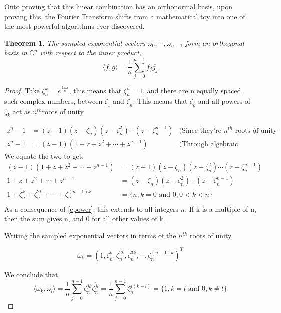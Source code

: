 \documentclass[11pt]{amsart}
\newtheorem{thm}{Theorem}[section]
\theoremstyle{definition}
\theoremstyle{remark}
\numberwithin{equation}{section}
\begin{document}
Onto proving that this linear combination has an orthonormal basis, upon proving this, the Fourier Transform shifts from a mathematical toy into one of the most powerful algorithms ever discovered.
\pagebreak
\begin{thm} \label{orthonormalbasis}
	The sampled exponential vectors $\omega_0, \cdots , \omega_{n-1}$ form an orthogonal basis in $\mathbb{C}^n$ with respect to the inner product,
	\[
		\langle f,g \rangle = \frac{1}{n} \sum_{j=0}^{n-1} f_j \overline{g_j}
	\]
\end{thm}
\begin{proof}
Take $\zeta_n^k = e^{\frac{2\pi k i}{n}}$, this means that $\zeta^n_n = 1$, and there are n equally spaced such complex numbers, between $\zeta_1$ and $\zeta_n$. This means that $\zeta_k$ and all powers of $\zeta_k$ act as $n^{th} $roots of unity

	\begin{align}
		z^{n}-1 &= (z-1)(z -  \zeta_n)(z-\zeta_n^2)\cdots(z - \zeta_n^{n-1}) &\text{(Since they're $n^{th}$ roots of unity})  \label{pf1} \\
		z^n-1 &= (z-1)(1 + z + z^2 + \cdots + z^{n-1}) &\text{(Through algebraic factorization)} \label{pf2}
	\end{align}
	We equate the two to get,
	\begin{align*}
	(z-1)(1 + z + z^2 + \cdots + z^{n-1})  &= (z-1)(z -  \zeta_n)(z-\zeta_n^2)\cdots(z - \zeta_n^{n-1}) \\
	1 + z + z^2 + \cdots + z^{n-1}  &= (z -  \zeta_n)(z-\zeta_n^2)\cdots(z - \zeta_n^{n-1}) \\
		1 + \zeta_n^k + \zeta_n^{2k} + \cdots + \zeta_n^{(n-1) k} &= \{n,k = 0 \text{ and } 0, 0 < k < n \} \\
	\end{align*}
As a consequence of \ref{epower}, this extends to all integers $n$. If k is a multiple of n, then the sum gives n, and 0 for all other values of k.

Writing the sampled exponential vectors in terms of the $n^{th}$ roots of unity,

\[
	\omega_k = (1, \zeta_n^k, \zeta_n^{2k},\zeta_n^{3k}, \cdots, \zeta_n^{(n-1)k})^T
\]

We conclude that, 
\[
	\langle	\omega_k, \omega_l \rangle = \frac{1}{n} \sum_{j=0}^{n-1} \zeta_{n}^{jk} \overline{\zeta_{n}^{jl}} = \frac{1}{n} \sum_{j=0}^{n-1} \zeta_n^{j(k-l)} = \{1, k = l \text{ and } 0, k \neq l\}
\]
\end{proof}
\end{document}
